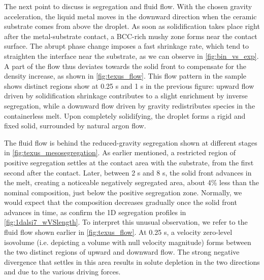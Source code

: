 The next point to discuss is segregation and fluid flow. With the chosen gravity acceleration, the liquid metal moves in the downward direction when the
ceramic substrate comes from above the droplet. As soon as solidification takes place right after the metal-substrate contact, a BCC-rich mushy zone 
forms near the contact surface. The abrupt phase change imposes a fast shrinkage rate, which tend to straighten the interface near the substrate, as we can observe in \cref{fig:bin_vs_exp}. 
A part of the flow thus deviates towards the solid front 
to compensate for the density increase, as shown in \cref{fig:texus_flow}. 
This flow pattern in the sample shows distinct regions show at 0.25 s and 1 s in the previous figure: 
upward flow driven by solidification shrinkage contributes to a slight enrichment by inverse segregation,
while a downward flow driven by gravity redistributes species in the containerless melt. Upon completely 
solidifying, the droplet forms a rigid and fixed solid, surrounded by natural argon flow. 

The fluid flow is behind the reduced-gravity segregation shown at different stages in \cref{fig:texus_mesosegregation}.
As earlier mentioned, a restricted region of positive segregation settles at the contact area with the substrate,
from the first second after the contact. Later, between 2 s and 8 s, the solid front advances in the melt, creating 
a noticeable negatively segregated area, about 4\% less than the nominal composition, just below the positive segregation zone.
Normally, we would expect that the composition decreases gradually once the solid front advances in time, as confirm the 1D segregation
profiles in \cref{fig:1dalsi7_wVSlength}. To interpret this unusual observation, we refer to the fluid flow shown earlier in \cref{fig:texus_flow}.
At 0.25 s, a velocity zero-level isovolume (i.e. depicting a volume with null velocity magnitude) forms between the two distinct regions
of upward and downward flow. The strong negative divergence that settles in this area results in solute depletion in the two directions
and due to the various driving forces. 

